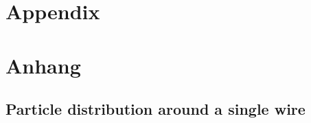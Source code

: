 

{\chapter{Appendix}}    %
{\chapter{Anhang}}      %
\label{chap:appendix}

\section{Particle distribution around a single wire}
\label{sec:app:}
\FloatBarrier
